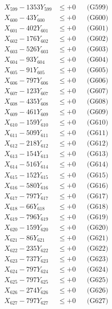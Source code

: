 \documentclass[a4paper,10pt]{article}
\begin{document}
{\begin{align}
X_{599} - 1353Y_{599} &\leq +0 && \text{(G599)} \\
X_{600} - 43Y_{600} &\leq +0 && \text{(G600)} \\
\allowbreak
X_{601} - 402Y_{601} &\leq +0 && \text{(G601)} \\
X_{602} - 176Y_{602} &\leq +0 && \text{(G602)} \\
X_{603} - 526Y_{603} &\leq +0 && \text{(G603)} \\
X_{604} - 93Y_{604} &\leq +0 && \text{(G604)} \\
X_{605} - 91Y_{605} &\leq +0 && \text{(G605)} \\
X_{606} - 797Y_{606} &\leq +0 && \text{(G606)} \\
X_{607} - 123Y_{607} &\leq +0 && \text{(G607)} \\
X_{608} - 435Y_{608} &\leq +0 && \text{(G608)} \\
X_{609} - 461Y_{609} &\leq +0 && \text{(G609)} \\
X_{610} - 159Y_{610} &\leq +0 && \text{(G610)} \\
\allowbreak
X_{611} - 509Y_{611} &\leq +0 && \text{(G611)} \\
X_{612} - 218Y_{612} &\leq +0 && \text{(G612)} \\
X_{613} - 154Y_{613} &\leq +0 && \text{(G613)} \\
X_{614} - 516Y_{614} &\leq +0 && \text{(G614)} \\
X_{615} - 152Y_{615} &\leq +0 && \text{(G615)} \\
X_{616} - 580Y_{616} &\leq +0 && \text{(G616)} \\
X_{617} - 797Y_{617} &\leq +0 && \text{(G617)} \\
X_{618} - 66Y_{618} &\leq +0 && \text{(G618)} \\
X_{619} - 796Y_{619} &\leq +0 && \text{(G619)} \\
X_{620} - 159Y_{620} &\leq +0 && \text{(G620)} \\
\allowbreak
X_{621} - 86Y_{621} &\leq +0 && \text{(G621)} \\
X_{622} - 235Y_{622} &\leq +0 && \text{(G622)} \\
X_{623} - 737Y_{623} &\leq +0 && \text{(G623)} \\
X_{624} - 797Y_{624} &\leq +0 && \text{(G624)} \\
X_{625} - 797Y_{625} &\leq +0 && \text{(G625)} \\
X_{626} - 274Y_{626} &\leq +0 && \text{(G626)} \\
X_{627} - 797Y_{627} &\leq +0 && \text{(G627)} \\

\end{align}}
\end{document}
